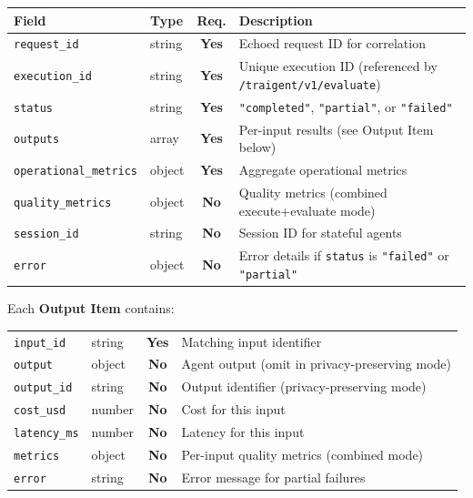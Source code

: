 \documentclass[11pt,a4paper]{article}
\newcommand{\field}[1]{\texttt{#1}}
\newcommand{\required}{\textbf{Yes}}
\newcommand{\optional}{\textbf{No}}
\newcommand{\status}[1]{\texttt{"#1"}}
\begin{document}
\begin{center}\small
\begin{tabularx}{\textwidth}{@{}llcX@{}}
\toprule
\textbf{Field} & \textbf{Type} & \textbf{Req.} & \textbf{Description} \\
\midrule
\field{request\_id}          & string & \required & Echoed request ID for correlation \\
\field{execution\_id}        & string & \required & Unique execution ID (referenced by \texttt{/traigent/v1/evaluate}) \\
\field{status}               & string & \required & \status{completed}, \status{partial}, or \status{failed} \\
\field{outputs}              & array  & \required & Per-input results (see Output Item below) \\
\field{operational\_metrics} & object & \required & Aggregate operational metrics \\
\field{quality\_metrics}     & object & \optional & Quality metrics (combined execute+evaluate mode) \\
\field{session\_id}          & string & \optional & Session ID for stateful agents \\
\field{error}                & object & \optional & Error details if \field{status} is \status{failed} or \status{partial} \\
\bottomrule
\end{tabularx}
\end{center}

Each \textbf{Output Item} contains:

\begin{center}\small
\begin{tabularx}{\textwidth}{@{}llcX@{}}
\toprule
\field{input\_id}   & string & \required & Matching input identifier \\
\field{output}      & object & \optional & Agent output (omit in privacy-preserving mode) \\
\field{output\_id}  & string & \optional & Output identifier (privacy-preserving mode) \\
\field{cost\_usd}   & number & \optional & Cost for this input \\
\field{latency\_ms} & number & \optional & Latency for this input \\
\field{metrics}     & object & \optional & Per-input quality metrics (combined mode) \\
\field{error}       & string & \optional & Error message for partial failures \\
\bottomrule
\end{tabularx}
\end{center}
\end{document}
